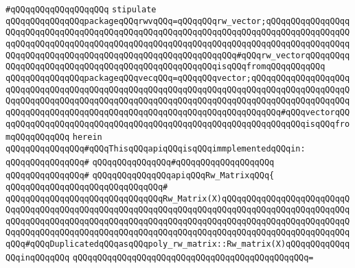 \verb|#qQQqqQQqqQQqqQQqqQQq|\newline
\newline
\newline
\newline
\verb|stipulate|\newline
\verb|qQQqqQQqqQQqqQQqpackageqQQqrwvqQQq=qQQqqQQqrw_vector;qQQqqQQqqQQqqQQqqQQqqQQqqQQqqQQqqQQqqQQqqQQqqQQqqQQqqQQqqQQqqQQqqQQqqQQqqQQqqQQqqQQqqQQqqQQqqQQqqQQqqQQqqQQqqQQqqQQqqQQqqQQqqQQqqQQqqQQqqQQqqQQqqQQqqQQqqQQqqQQqqQQqqQQqqQQqqQQqqQQqqQQqqQQqqQQqqQQqqQQqqQQq#qQQqrw_vectorqQQqqQQqqQQqqQQqqQQqqQQqqQQqqQQqqQQqqQQqqQQqqQQqqQQqisqQQqfromqQQqqQQqqQQq|\newline
\verb|qQQqqQQqqQQqqQQqpackageqQQqvecqQQq=qQQqqQQqvector;qQQqqQQqqQQqqQQqqQQqqQQqqQQqqQQqqQQqqQQqqQQqqQQqqQQqqQQqqQQqqQQqqQQqqQQqqQQqqQQqqQQqqQQqqQQqqQQqqQQqqQQqqQQqqQQqqQQqqQQqqQQqqQQqqQQqqQQqqQQqqQQqqQQqqQQqqQQqqQQqqQQqqQQqqQQqqQQqqQQqqQQqqQQqqQQqqQQqqQQqqQQqqQQqqQQqqQQq#qQQqvectorqQQqqQQqqQQqqQQqqQQqqQQqqQQqqQQqqQQqqQQqqQQqqQQqqQQqqQQqqQQqqQQqisqQQqfromqQQqqQQqqQQq|\newline
\verb|herein|\newline
\newline
\verb|qQQqqQQqqQQqqQQq#qQQqThisqQQqapiqQQqisqQQqimmplementedqQQqin:|\newline
\verb|qQQqqQQqqQQqqQQq#|\newline
\verb|qQQqqQQqqQQqqQQq#qQQqqQQqqQQqqQQqqQQq|\newline
\verb|qQQqqQQqqQQqqQQq#|\newline
\verb|qQQqqQQqqQQqqQQqapiqQQqRw_MatrixqQQq{|\newline
\verb|qQQqqQQqqQQqqQQqqQQqqQQqqQQqqQQq#|\newline
\verb|qQQqqQQqqQQqqQQqqQQqqQQqqQQqqQQqRw_Matrix(X)qQQqqQQqqQQqqQQqqQQqqQQqqQQqqQQqqQQqqQQqqQQqqQQqqQQqqQQqqQQqqQQqqQQqqQQqqQQqqQQqqQQqqQQqqQQqqQQqqQQqqQQqqQQqqQQqqQQqqQQqqQQqqQQqqQQqqQQqqQQqqQQqqQQqqQQqqQQqqQQqqQQqqQQqqQQqqQQqqQQqqQQqqQQqqQQqqQQqqQQqqQQqqQQqqQQqqQQqqQQqqQQqqQQqqQQqqQQqqQQq#qQQqDuplicatedqQQqasqQQqpoly_rw_matrix::Rw_matrix(X)qQQqqQQqqQQqqQQqinqQQqqQQq|\newline
\verb|qQQqqQQqqQQqqQQqqQQqqQQqqQQqqQQqqQQqqQQqqQQqqQQq=|\newline
